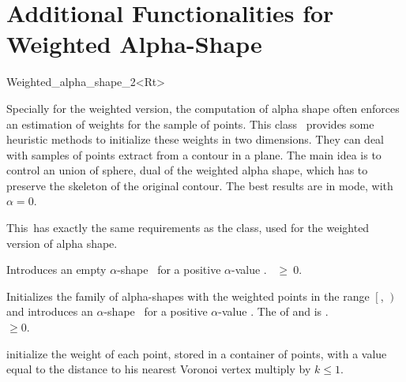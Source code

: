 
\section{Additional Functionalities for Weighted Alpha-Shape\label{I2_SectWeighted_Alpha_Shape_2}}

\begin{ccClassTemplate} {Weighted_alpha_shape_2<Rt>}

\ccDefinition
Specially for the weighted version, the computation of alpha shape often
enforces an estimation of weights for the sample of points. This class
\ccClassTemplateName\ provides some heuristic methods to initialize these
weights in two dimensions. They can deal with samples of points extract from a
contour in a plane. The main idea is to control an union of sphere, dual of the
weighted alpha shape, which has to preserve the skeleton of the original
contour. The best results are in  mode, with $\alpha=0$.


\ccInheritsFrom


This\ccClassTemplateName\ has exactly the same requirements as the
 class, used for the weighted version of alpha shape.

\ccCreation
{}

{Introduces an empty $\alpha$-shape \ccVar\ for a positive $\alpha$-value
 .
\ccPrecond {}~$\geq~0$.}


{Initializes the family of alpha-shapes with the weighted points in the range
$\left[\right.$, $\left.\right)$ and 
introduces an $\alpha$-shape \ccVar\ for a positive $\alpha$-value
.  
\ccPrecond The  of  and
 is .\\
 $\geq 0$.}

\ccOperations

{initialize the weight of each point, stored in a container of points, with a value
equal to the distance to his nearest Voronoi vertex multiply by $k \leq 1$.} 
  

\end{ccClassTemplate}
